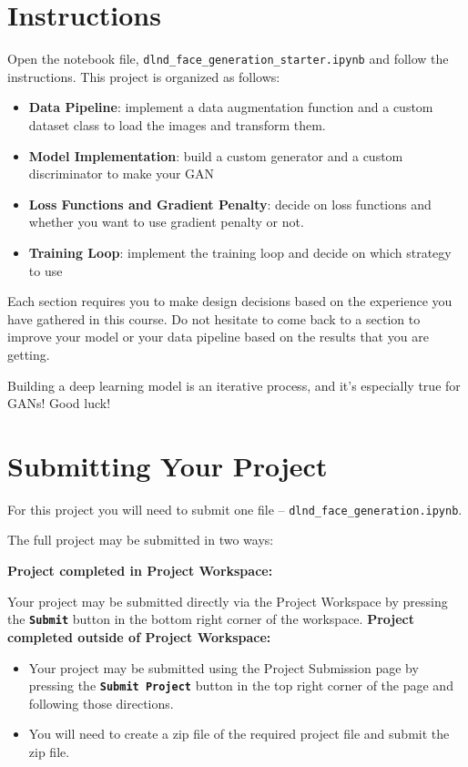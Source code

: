 \section{Instructions}

Open the notebook file, \verb|dlnd_face_generation_starter.ipynb| and follow the instructions. This project is organized as follows:

\begin{itemize}
    \item \textbf{Data Pipeline}: implement a data augmentation function and a custom dataset class to load the images and transform them.
    \item \textbf{Model Implementation}: build a custom generator and a custom discriminator to make your GAN
    \item \textbf{Loss Functions and Gradient Penalty}: decide on loss functions and whether you want to use gradient penalty or not.
    \item \textbf{Training Loop}: implement the training loop and decide on which strategy to use
\end{itemize}
Each section requires you to make design decisions based on the experience you have gathered in this course. Do not hesitate to come back to a section to improve your model or your data pipeline based on the results that you are getting.

Building a deep learning model is an iterative process, and it's especially true for GANs! Good luck!

\section{Submitting Your Project}

For this project you will need to submit one file – \verb|dlnd_face_generation.ipynb|.

The full project may be submitted in two ways:

\textbf{Project completed in Project Workspace:}

Your project may be submitted directly via the Project Workspace by pressing the \textbf{\verb|Submit|} button in the bottom right corner of the workspace.
\textbf{Project completed outside of Project Workspace:}

\begin{itemize}
    \item Your project may be submitted using the Project Submission page by pressing the \textbf{\verb|Submit Project|} button in the top right corner of the page and following those directions.
    \item You will need to create a zip file of the required project file and submit the zip file.
\end{itemize}
